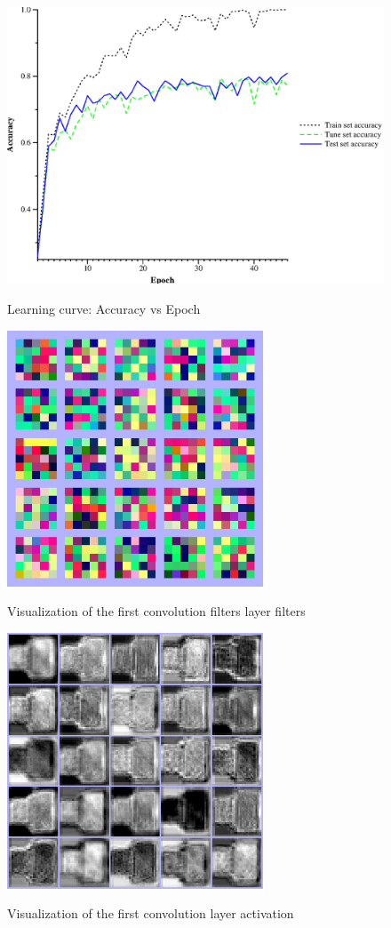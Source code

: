 \documentclass{article}
\begin{document}
\begin{figure}[!ht]
 \centering
  \includegraphics[width=4.8in]{epoch.eps}
 \label{trainepoch}
 \caption{Learning curve: Accuracy vs Epoch}
\end{figure}

\begin{figure}[!ht]
 \centering
  \includegraphics[width=3.0in]{epoch_46_l1_filters.png}
 \label{L1filters}
 \caption{Visualization of the first convolution filters layer filters}
\end{figure}

\begin{figure}[!ht]
 \centering
  \includegraphics[width=3.0in]{epoch_46_l2_activation.png}
 \label{L1Act}
 \caption{Visualization of the first convolution layer activation}
\end{figure}
\end{document}
